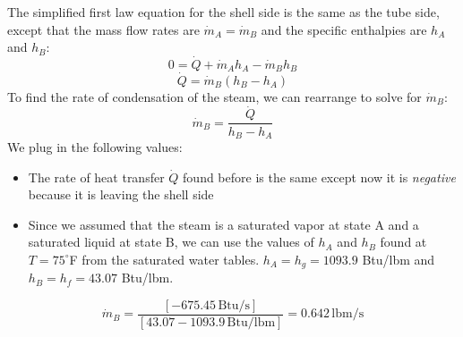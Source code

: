 \documentclass[12pt]{article}
\begin{document}
The simplified first law equation for the shell side is the same as the tube side, except that the mass flow rates are $\dot{m}_A = \dot{m}_B$ and the specific enthalpies are $h_A$ and $h_B$:
\[0 = \dot{Q} + \dot{m}_A h_A - \dot{m}_B h_B\]
\[\dot{Q} = \dot{m}_B (h_B - h_A)\]
To find the rate of condensation of the steam, we can rearrange to solve for $\dot{m}_B$:
\[\dot{m}_B = \frac{\dot{Q}}{h_B - h_A} \]
We plug in the following values:
\begin{itemize}
    \item The rate of heat transfer $\dot{Q}$ found before is the same except now it is \textit{negative} because it is leaving the shell side
    \item Since we assumed that the steam is a saturated vapor at state A and a saturated liquid at state B, we can use the values of $h_A$ and $h_B$ found at $T=75^\circ$F from the saturated water tables. $h_A = h_g = 1093.9$ Btu/lbm and $h_B = h_f = 43.07$ Btu/lbm.
\end{itemize}
\[\dot{m}_B = \frac{[-675.45\,\text{Btu/s}]}{[43.07 - 1093.9\,\text{Btu/lbm}]} = \boxed{0.642\,\text{lbm/s}}\]
\end{document}
